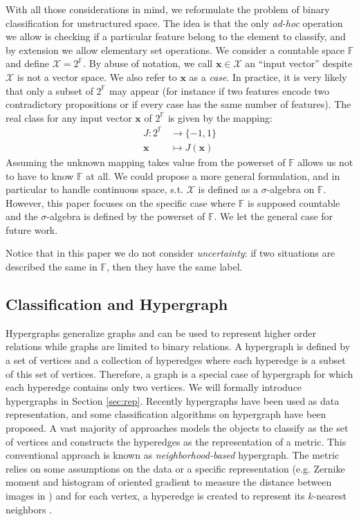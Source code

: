 \documentclass[preprint,12pt]{elsarticle}
\theoremstyle{definition}
\begin{document}
With all those considerations in mind, we reformulate the problem of binary classification for unstructured space. The idea is that the only {\it ad-hoc} operation we allow is checking if a particular feature belong to the element to classify, and by extension we allow elementary set operations. We consider a countable space $\mathbb{F}$ and define $\mathcal X = 2^{\mathbb{F}}$. By abuse of notation, we call   $\mathbf{x} \in \mathcal X$ an ``input vector'' despite $\mathcal X$ is not a vector space. We also refer to $\mathbf{x}$ as a {\it case}. In practice, it is very likely that only a subset of $2^{\mathbb{F}}$ may appear (for instance if two features encode two contradictory propositions or if every case has the same number of features).
The real class for any input vector $\mathbf{x}$ of $2^{\mathbb{F}}$ is given by the mapping:
\begin{align}
    \label{assumption_mapping}
   J \colon 2^{\mathbb{F}} & \to \{-1,1 \} \\
   \mathbf{x} &\mapsto J(\mathbf{x})
\end{align}
Assuming the unknown mapping takes value from the powerset of $\mathbb{F}$ allows us not to have to know $\mathbb{F}$ at all. We could propose a more general formulation, and in particular to handle continuous space, s.t. $\mathcal X$ is defined as a $\sigma$-algebra on $\mathbb F$. However, this paper focuses on the specific case where $\mathbb{F}$ is supposed countable and the $\sigma$-algebra is defined by the powerset of $\mathbb{F}$. We let the general case for future work.

Notice that in this paper we do not consider {\it uncertainty}: if two situations are described the same in $\mathbb{F}$, then they have the same label.

\subsection{Classification and Hypergraph}
\label{sec:state_of_art}

Hypergraphs generalize graphs and can be used to represent higher order relations while graphs are limited to binary relations. A hypergraph is defined by a set of vertices and a collection of hyperedges where each hyperedge is a subset of this set of vertices. Therefore, a graph is a special case of hypergraph for which each hyperedge contains only two vertices. We will formally introduce hypergraphs in Section \ref{sec:rep}.
Recently hypergraphs have been used as data representation, and some classification algorithms on hypergraph have been proposed. A vast majority of approaches models the objects to classify as the set of vertices and constructs the hyperedges as the representation of a metric. This conventional approach is known as {\it neighborhood-based} hypergraph. The metric relies on some assumptions on the data or a specific representation (e.g. Zernike moment and histogram of oriented gradient to measure the distance between images in \cite{ijcai2017-387}) and for each vertex, a hyperedge is created to represent its $k$-nearest neighbors \cite{5540012}. 
\end{document}
